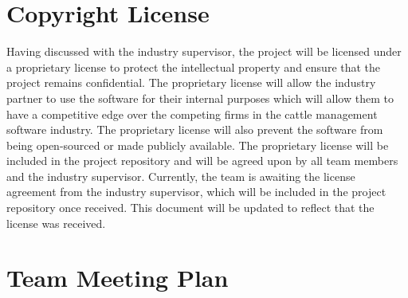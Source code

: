 \documentclass{article}
\begin{document}

\section{Copyright License}
Having discussed with the industry supervisor, the project will be licensed under a proprietary license to protect
 the intellectual property and ensure that the project remains confidential. The proprietary
  license will allow the industry partner to use the software for their internal purposes which will allow them to have a competitive edge over the competing firms in the cattle management software industry.
  The proprietary license will also prevent the software from being open-sourced or made publicly available. 
  The proprietary license will be included in the project repository and will be agreed upon by all team members and the industry supervisor.
  Currently, the team is awaiting the license agreement from the industry supervisor, which will be included in the project repository once received. This document will be updated to reflect that the license was received.

\section{Team Meeting Plan}
\end{document}
